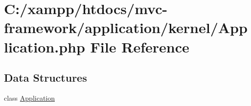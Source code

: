 \hypertarget{_application_8php}{}\section{C\+:/xampp/htdocs/mvc-\/framework/application/kernel/\+Application.php File Reference}
\label{_application_8php}
\subsection*{Data Structures}
\begin{DoxyCompactItemize}
\item 
class \hyperlink{class_application}{Application}
\end{DoxyCompactItemize}
